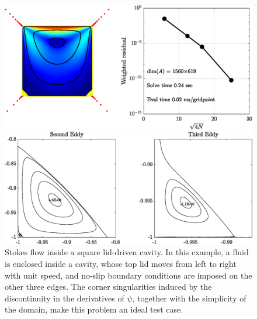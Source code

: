 \begin{figure}[H]
	
	\centering
	\includegraphics[width=\linewidth]{Figures/ldc}
	
	\vspace{2em}
	\includegraphics[width=\linewidth]{Figures/ldc_eddy}
	
	\caption{Stokes flow inside a square lid-driven cavity. In this example, a fluid is enclosed inside
		a cavity, whose top lid moves from left to right with unit speed, and no-slip boundary conditions
		are imposed on the other three edges. The corner singularities induced by the discontinuity in
		the derivatives of $\psi$, together with the simplicity of the domain, make this problem an ideal test
		case.}
	\label{fig:ldc}
\end{figure} 

